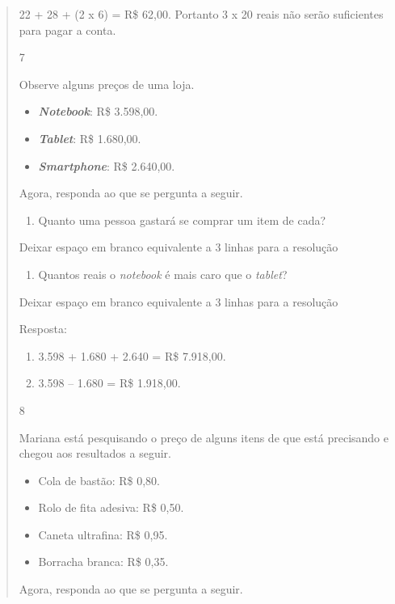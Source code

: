 \begin{mdframed}[linewidth=2pt,linecolor=salmao,roundcorner=2pt]
\begin{itemize}
{\begin{itemize}
\begin{escolha}
{\begin{quote}
{\begin{escolha}
22 + 28 + (2 x 6) = R\$ 62,00.
Portanto 3 x 20 reais não serão suficientes para pagar a conta.

\num{7}

Observe alguns preços de uma loja.

\begin{itemize}
  \item \textbf{\textit{Notebook}}: R\$ 3.598,00.
  \item \textbf{\textit{Tablet}}: R\$ 1.680,00.
  \item \textbf{\textit{Smartphone}}: R\$ 2.640,00.
\end{itemize}

Agora, responda ao que se pergunta a seguir.

\begin{enumerate}
\item
  Quanto uma pessoa gastará se comprar um item de cada?
\end{enumerate}

Deixar espaço em branco equivalente a 3 linhas para a resolução

\begin{enumerate}
\item
  Quantos reais o \textit{notebook} é mais caro que o \textit{tablet}?
\end{enumerate}

Deixar espaço em branco equivalente a 3 linhas para a resolução

Resposta:

\begin{enumerate}
\item
  3.598 + 1.680 + 2.640 = R\$ 7.918,00.
\item
  3.598 -- 1.680 = R\$ 1.918,00.
\end{enumerate}

\num{8}

Mariana está pesquisando o preço de alguns itens de que está precisando e chegou aos resultados a seguir.

\begin{itemize}
  \item Cola de bastão: R\$ 0,80.
  \item Rolo de fita adesiva: R\$ 0,50.
  \item Caneta ultrafina: R\$ 0,95.
  \item Borracha branca: R\$ 0,35.
\end{itemize}

Agora, responda ao que se pergunta a seguir.


\end{escolha}}
\end{quote}}
\end{escolha}
\end{itemize}}
\end{itemize}
\end{mdframed}
